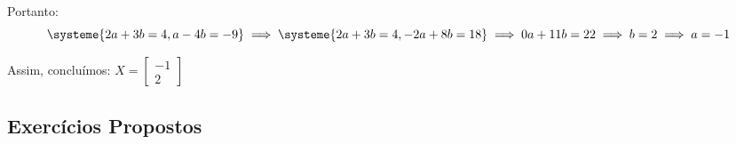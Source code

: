 \begin{exercise}
\begin{enumerate}
{		      Portanto: \[
			      \systeme{
				      2a + 3b = 4,
				      a - 4b = -9
			      } \implies
			      \systeme{
				      2a + 3b = 4,
				      -2a + 8b = 18
			      } \implies
			      0a + 11b = 22 \implies b = 2 \implies a = -1
		      \]

		      Assim, concluímos: $X = \begin{bmatrix}
				      -1 \\
				      2
			      \end{bmatrix}$
		      }
	\end{enumerate}
\end{exercise}

\subsection{Exercícios Propostos}

